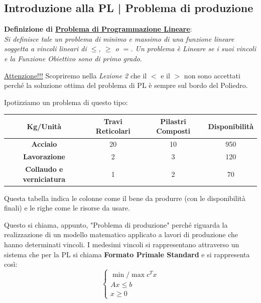 \documentclass[12pt, a4paper]{article}
\renewcommand{\arraystretch}{1.25}
\begin{document}
	\subsection*{Introduzione alla PL | Problema di produzione} %
	
	\textbf{Definizione di \underline{Problema di Programmazione Lineare}}:\\
	\textit{Si definisce tale un problema di minimo e massimo di una funzione lineare soggetta a vincoli lineari di $\leq$, $\geq$ o $=$. Un problema è Lineare se i suoi vincoli e la Funzione Obiettivo sono di primo grado}.
	
	\underline{Attenzione!!!} Scopriremo nella \textit{Lezione 2} che il $<$ e il $>$ non sono accettati perché la soluzione ottima del problema di PL è sempre sul bordo del Poliedro.
	
	\vspace{0.4cm}
	Ipotizziamo un problema di questo tipo:
	
	\begin{table}[H]
		\centering
		\renewcommand{\arraystretch}{1.3}
		\begin{tabular}{|c|c|c|c|}
			\hline
			\textbf{Kg/Unità} & \textbf{Travi Reticolari} & \textbf{Pilastri Composti} & \textbf{Disponibilità} \\ \hline
			\textbf{Acciaio} & 20 & 10 & 950 \\ \hline
			\textbf{Lavorazione} & 2 & 3 & 120 \\ \hline
			\textbf{Collaudo e verniciatura} & 1 & 2 & 70 \\ \hline
		\end{tabular}
	\end{table}
	
	Questa tabella indica le colonne come il bene da produrre (con le disponibilità finali) e le righe come le risorse da usare.
	
	Questo si chiama, appunto, "Problema di produzione" perché riguarda la realizzazione di un modello matematico applicato a lavori di produzione che hanno determinati vincoli. I medesimi vincoli si rappresentano attraverso un sistema che per la PL si chiama \textbf{Formato Primale Standard} e si rappresenta così:
	\[
	\begin{cases}
		\min/\max c^Tx \\
		Ax \leq b \\
		x \geq 0
	\end{cases}
	\]
	
\end{document}
